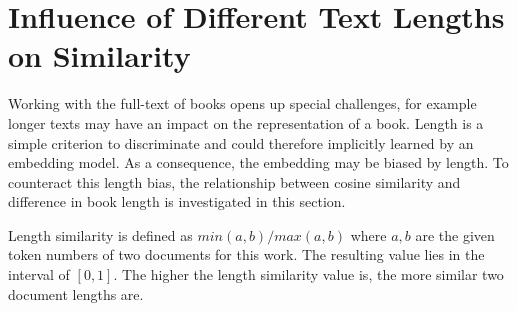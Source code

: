 \documentclass[11pt]{article}
\begin{document}

\section{Influence of Different Text Lengths on Similarity}
\label{sec:long_text_problem}
Working with the full-text of books opens up special challenges, for example longer texts may have an impact on the representation of a book.
Length is a simple criterion to discriminate and could therefore implicitly learned by an embedding model.
As a consequence, the embedding may be biased by length.
To counteract this length bias, the relationship between cosine similarity and difference in book length is investigated in this section.

Length similarity is defined as $min(a,b) / max(a, b)$ where $a, b$ are the given token numbers of two documents for this work.
The resulting value lies in the interval of $[0, 1]$.
The higher the length similarity value is, the more similar two document lengths are.
\end{document}
